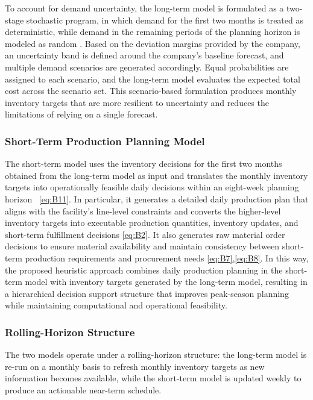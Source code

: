 \documentclass[nocoverpage]{buIE47xbooklet}
\begin{document}
To account for demand uncertainty, the long-term model is formulated as a two-stage stochastic program, in which demand for the first two months is treated as deterministic, while demand in the remaining periods of the planning horizon is modeled as random \citep{BirgeLouveaux2011}. Based on the deviation margins provided by the company, an uncertainty band is defined around the company’s baseline forecast, and multiple demand scenarios are generated accordingly. Equal probabilities are assigned to each scenario, and the long-term model evaluates the expected total cost across the scenario set. This scenario-based formulation produces monthly inventory targets that are more resilient to uncertainty and reduces the limitations of relying on a single forecast.
\subsubsection{Short-Term Production Planning Model}
The short-term model uses the inventory decisions for the first two months obtained from the long-term model as input and translates the monthly inventory targets into operationally feasible daily decisions within an eight-week planning horizon ~\eqref{eq:B11}. In particular, it generates a detailed daily production plan that aligns with the facility’s line-level constraints and converts the higher-level inventory targets into executable production quantities, inventory updates, and short-term fulfillment decisions \eqref{eq:B2}. It also generates raw material order decisions to ensure material availability and maintain consistency between short-term production requirements and procurement needs \eqref{eq:B7},\eqref{eq:B8}. In this way, the proposed heuristic approach combines daily production planning in the short-term model with inventory targets generated by the long-term model, resulting in a hierarchical decision support structure that improves peak-season planning while maintaining computational and operational feasibility.
\subsubsection{Rolling-Horizon Structure}
The two models operate under a rolling-horizon structure: the long-term model is re-run on a monthly basis to refresh monthly inventory targets as new information becomes available, while the short-term model is updated weekly to produce an actionable near-term schedule. 
\end{document}
